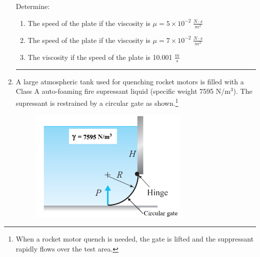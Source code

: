 \documentclass[12pt]{article}
\begin{document}
\begin{enumerate}
Determine:
\begin{enumerate}
\item The speed of the plate if the viscosity is $\mu=5 \times 10^{-2}~\frac{N \cdot s}{m^2}$
\item The speed of the plate if the viscosity is $\mu=7 \times 10^{-2}~\frac{N \cdot s}{m^2}$
\item The viscosity if the speed of the plate is 10.001 $\frac{m}{s}$
\end{enumerate}
\noindent\rule{\linewidth}{0.4pt}


\clearpage
\item A large atmospheric tank used for quenching rocket motors is filled with a Class A auto-foaming fire supressant liquid (specific weight 7595 N/m$^3$).  The supressant is restrained by a circular gate as shown.\footnote{When a rocket motor quench is needed, the gate is lifted and the suppressant rapidly flows over the test area.}  

\begin{figure}[h!] %
   \centering
   \includegraphics[width=3in]{circlegate.png} 
   \caption{}
   \label{fig:circlegate}
\end{figure}


\end{enumerate}
\end{document}
